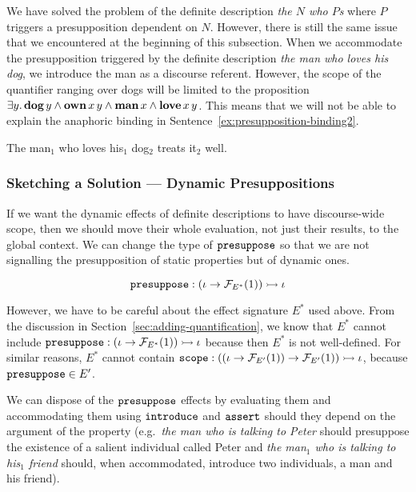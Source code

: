 We have solved the problem of the definite description \emph{the $N$ who
  $P$s} where $P$ triggers a presupposition dependent on $N$. However,
there is still the same issue that we encountered at the beginning of this
subsection. When we accommodate the presupposition triggered by the
definite description \emph{the man who loves his dog}, we introduce the man
as a discourse referent. However, the scope of the quantifier ranging over
dogs will be limited to the proposition
$\exists y.\, \textbf{dog}\,y \land \textbf{own}\,x\,y \land
\textbf{man}\,x \land \textbf{love}\,x\,y$. This means that we will
not be able to explain the anaphoric binding in
Sentence~\ref{ex:presupposition-binding2}.

\begin{exe}
  \ex The man$_1$ who loves his$_1$ dog$_2$ treats it$_2$ well. \label{ex:presupposition-binding2}
\end{exe}


\subsubsection{Sketching a Solution --- Dynamic Presuppositions}

If we want the dynamic effects of definite descriptions to have
discourse-wide scope, then we should move their whole evaluation, not just
their results, to the global context. We can change the type of
$\mathtt{presuppose}$ so that we are not signalling the presupposition of
static properties but of dynamic ones.

$$
\mathtt{presuppose} : (\iota \to \mathcal{F}_{E^*}(1)) \rightarrowtail \iota
$$

However, we have to be careful about the effect signature $E^*$ used
above. From the discussion in Section~\ref{sec:adding-quantification}, we
know that $E^*$ cannot include
$\mathtt{presuppose} : (\iota \to \mathcal{F}_{E^*}(1)) \rightarrowtail \iota$ because then $E^*$
is not well-defined. For similar reasons, $E^*$ cannot contain
$\mathtt{scope} : ((\iota \to \mathcal{F}_{E'}(1)) \to \mathcal{F}_{E'}(1)) \rightarrowtail \iota$,
because $\mathtt{presuppose} \in E'$.

We can dispose of the $\mathtt{presuppose}$ effects by evaluating them and
accommodating them using $\mathtt{introduce}$ and $\mathtt{assert}$ should they
depend on the argument of the property (e.g.\ \emph{the man who is talking
  to Peter} should presuppose the existence of a salient individual called
Peter and \emph{the man$_1$ who is talking to his$_1$ friend} should, when
accommodated, introduce two individuals, a man and his friend).

